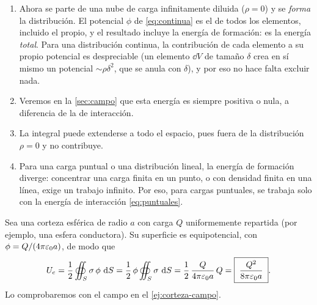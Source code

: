 \begin{observacion}\label{obs:total}
\begin{enumerate}
  \item Ahora se parte de una nube de carga infinitamente diluida ($\rho=0$) y se \emph{forma} la distribución. El potencial $\phi$ de
        \eqref{eq:continua} es el de todos los elementos, incluido el propio, y el resultado incluye la energía de formación: es la
        energía \emph{total}. Para una distribución continua, la contribución de cada elemento a su propio potencial es despreciable
        (un elemento $\dd V$ de tamaño $\delta$ crea en sí mismo un potencial $\sim\rho\delta^2$, que se anula con $\delta$), y por eso no hace falta
        excluir nada.
  \item Veremos en la \cref{sec:campo} que esta energía es siempre positiva o nula, a diferencia de la de interacción.
  \item La integral puede extenderse a todo el espacio, pues fuera de la distribución $\rho=0$ y no contribuye.
  \item Para una carga puntual o una distribución lineal, la energía de formación diverge: concentrar una carga finita en un punto, o
        con densidad finita en una línea, exige un trabajo infinito. Por eso, para cargas puntuales, se trabaja solo con la energía de
        interacción \eqref{eq:puntuales}.
\end{enumerate}
\end{observacion}

\begin{ejemplo}\label{ej:corteza}
Sea una corteza esférica de radio $a$ con carga $Q$ uniformemente repartida (por ejemplo, una esfera conductora). Su superficie es
equipotencial, con $\phi=Q/(4\pi\varepsilon_0 a)$, de modo que
\[
  U_e=\frac12\oiint_S\sigma\,\phi\,\mathop{}\!\mathrm{d} S=\frac12\,\phi\oiint_S\sigma\,\mathop{}\!\mathrm{d} S=\frac12\,\frac{Q}{4\pi\varepsilon_0 a}\,Q=\boxed{\;\frac{Q^2}{8\pi\varepsilon_0 a}\;}.
\]
Lo comprobaremos con el campo en el \cref{ej:corteza-campo}.
\end{ejemplo}
